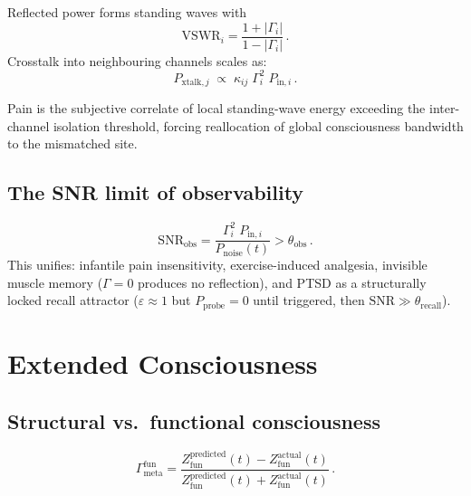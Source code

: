 \documentclass[aps,pre,twocolumn,superscriptaddress,floatfix]{revtex4-2}
\begin{document}
Reflected power forms standing waves with
\begin{equation}
  \mathrm{VSWR}_i = \frac{1 + |\Gamma_i|}{1 - |\Gamma_i|}\,.
  \label{eq:vswr}
\end{equation}
Crosstalk into neighbouring channels scales as:
\begin{equation}
  P_{\text{xtalk},j}
  \;\propto\;
  \kappa_{ij}\;\Gamma_i^2\;P_{\text{in},i}\,.
  \label{eq:crosstalk}
\end{equation}

\begin{definition}
\label{def:pain-hijack}
Pain is the subjective correlate of local standing-wave
energy exceeding the inter-channel isolation threshold,
forcing reallocation of global consciousness bandwidth
to the mismatched site.
\end{definition}

\subsection{The SNR limit of observability}
\label{sec:snr-observability}

\begin{equation}
  \mathrm{SNR}_{\text{obs}}
  = \frac{\Gamma_i^2\;P_{\text{in},i}}
         {P_{\text{noise}}(t)}
  > \theta_{\text{obs}}\,.
  \label{eq:snr-obs}
\end{equation}
This unifies: infantile pain insensitivity,
exercise-induced analgesia, invisible muscle memory
($\Gamma=0$ produces no reflection), and PTSD as a
structurally locked recall attractor
($\varepsilon\approx 1$ but $P_{\text{probe}}=0$
until triggered, then
$\mathrm{SNR}\gg\theta_{\text{recall}}$).


\section{Extended Consciousness}
\label{sec:extended}

\subsection{Structural vs.\ functional consciousness}
\label{sec:two-layer}

\begin{equation}
  \Gamma_{\text{meta}}^{\text{fun}} =
    \frac{Z_{\text{fun}}^{\text{predicted}}(t)
          - Z_{\text{fun}}^{\text{actual}}(t)}
         {Z_{\text{fun}}^{\text{predicted}}(t)
          + Z_{\text{fun}}^{\text{actual}}(t)}\,.
  \label{eq:Gamma-fun}
\end{equation}
\end{document}
